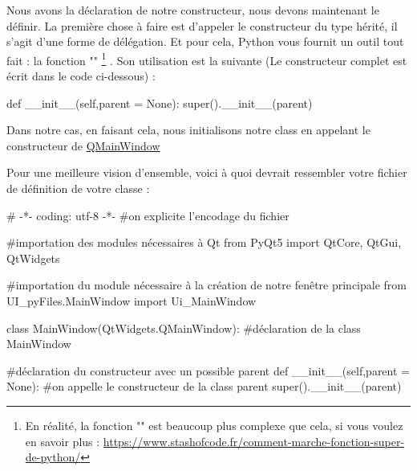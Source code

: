 {Nous avons la déclaration de notre constructeur, nous devons maintenant le définir.\newline
La première chose à faire est d'appeler le constructeur du type hérité, il s'agit d'une forme de délégation. Et pour cela, Python vous fournit un outil tout fait : la fonction ""
\footnote
{En réalité, la fonction "" est beaucoup plus complexe que cela, si vous voulez en savoir plus : \url{https://www.stashofcode.fr/comment-marche-fonction-super-de-python/}}
. Son utilisation est la suivante (Le constructeur complet est écrit dans le code ci-dessous) :
\begin{Python}
def __init__(self,parent = None):
		super().__init__(parent)
\end{Python}
Dans notre cas, en faisant cela, nous initialisons notre class en appelant le constructeur de \href{https://doc.qt.io/qt-5/qmainwindow.html}{QMainWindow}\newpage


Pour une meilleure vision d'ensemble, voici à quoi devrait ressembler votre fichier de définition de votre classe  :
\begin{Python}
# -*- coding: utf-8 -*-
#on explicite l’encodage du fichier

#importation des modules nécessaires à Qt
from PyQt5 import QtCore, QtGui, QtWidgets

#importation du module nécessaire à la création de notre fenêtre principale
from UI_pyFiles.MainWindow import Ui_MainWindow

class MainWindow(QtWidgets.QMainWindow): #déclaration de la class MainWindow

	#déclaration du constructeur avec un possible parent
	def __init__(self,parent = None):
		#on appelle le constructeur de la class parent
		super().__init__(parent)
\end{Python}

}
